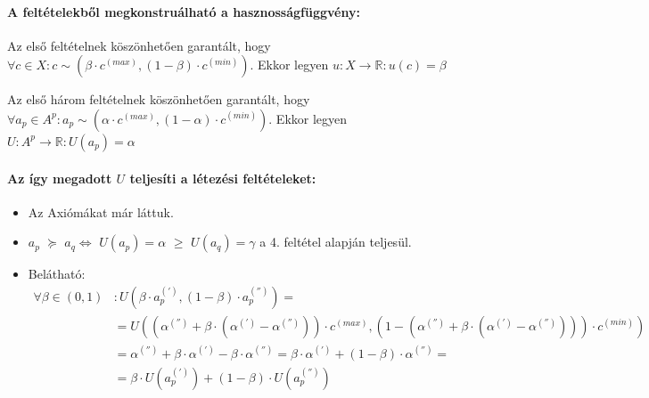 \documentclass[a4paper,12pt]{article}
\begin{document}
\paragraph{A feltételekből megkonstruálható a hasznosságfüggvény: }

Az első feltételnek köszönhetően garantált, hogy $\forall c \in X: c \sim (\beta \cdot c^{(max)}, (1-\beta) \cdot c^{(min)})$. Ekkor legyen $u: X \rightarrow \mathbb{R} : u(c) = \beta$


Az első három feltételnek köszönhetően garantált, hogy $\forall a_p \in A^p: a_p \sim (\alpha \cdot c^{(max)}, (1-\alpha)\cdot c^{(min)})$. Ekkor legyen $U: A^p \rightarrow \mathbb{R} : U(a_p) = \alpha$ 


\paragraph{Az így megadott $U$ teljesíti a létezési feltételeket: }
\begin{itemize}
\item Az Axiómákat már láttuk. 
\item $a_p$  $\succeq$ $a_q \Leftrightarrow $ $U(a_p) = \alpha$  $\geq$ $U(a_q) = \gamma$ a 4. feltétel alapján teljesül.
\item Belátható: \begin{equation}
\begin{split} 
\forall  \beta \in (0,1)&: U(\beta\cdot a^{(')}_p , (1-\beta)\cdot a^{('')}_p ) = \\
 & = U((\alpha^{('')} + \beta\cdot (\alpha^{(')} - \alpha^{('')} ))\cdot c^{(max)},(1 - (\alpha^{('')} + \beta\cdot (\alpha^{(')} - \alpha^{('')} )))\cdot c^{(min)}) \\
 & = \alpha^{('')} + \beta\cdot \alpha^{(')} - \beta\cdot \alpha^{('')} = \beta\cdot \alpha^{(')} + (1-\beta) \cdot  \alpha^{('')} = \\
 & =  \beta\cdot U(a^{(')}_p) + (1-\beta)\cdot U(a^{('')}_p)\\
\end{split}
\end{equation} 
\end{itemize}
\end{document}
